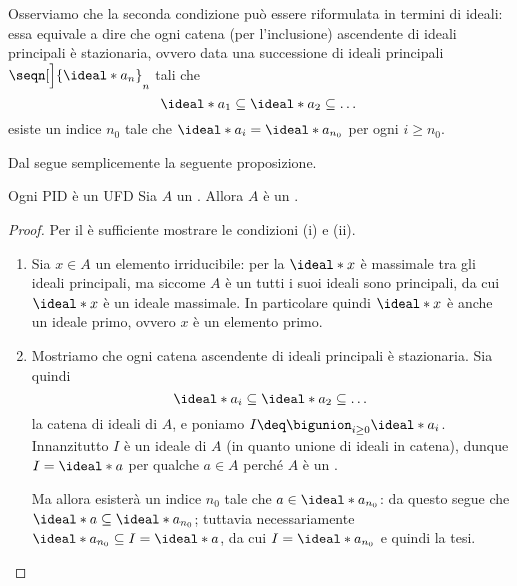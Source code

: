 Osserviamo che la seconda condizione può essere riformulata in termini di ideali: essa equivale a dire che ogni catena (per l'inclusione) ascendente di ideali principali è stazionaria, ovvero data una successione di ideali principali $\seqn[\Big]{\ideal*{a_n}}_n$ tali che \[
    \ideal*{a_1} \subseteq \ideal*{a_2} \subseteq \dots   
\] esiste un indice $n_0$ tale che $\ideal*{a_i} = \ideal*{a_{n_0}}$ per ogni $i \geq n_0$.

Dal  segue semplicemente la seguente proposizione.
\begin{proposition}
    {Ogni PID è un UFD}{} Sia $A$ un \PID. Allora $A$ è un \UFD.
\end{proposition}
\begin{proof}
    Per il  è sufficiente mostrare le condizioni (i) e (ii).
    \begin{enumerate}[label={(\roman*)}]
        \item Sia $x \in A$ un elemento irriducibile: per la  $\ideal*{x}$ è massimale tra gli ideali principali, ma siccome $A$ è un \PID tutti i suoi ideali sono principali, da cui $\ideal*{x}$ è un ideale massimale. In particolare quindi $\ideal*{x}$ è anche un ideale primo, ovvero $x$ è un elemento primo.
        \item Mostriamo che ogni catena ascendente di ideali principali è stazionaria. Sia quindi \[
            \ideal*{a_i} \subseteq \ideal*{a_2} \subseteq \dots    
        \] la catena di ideali di $A$, e poniamo $I \deq \bigunion_{i \geq 0} \ideal*{a_i}$. Innanzitutto $I$ è un ideale di $A$ (in quanto unione di ideali in catena), dunque $I = \ideal*{a}$ per qualche $a \in A$ perché $A$ è un \PID. 
        
        Ma allora esisterà un indice $n_0$ tale che $a \in \ideal*{a_{n_0}}$: da questo segue che $\ideal*{a} \subseteq \ideal*{a_{n_0}}$; tuttavia necessariamente $\ideal*{a_{n_0}} \subseteq I = \ideal*{a}$, da cui $I = \ideal*{a_{n_0}}$ e quindi la tesi. \qedhere
    \end{enumerate}
\end{proof}